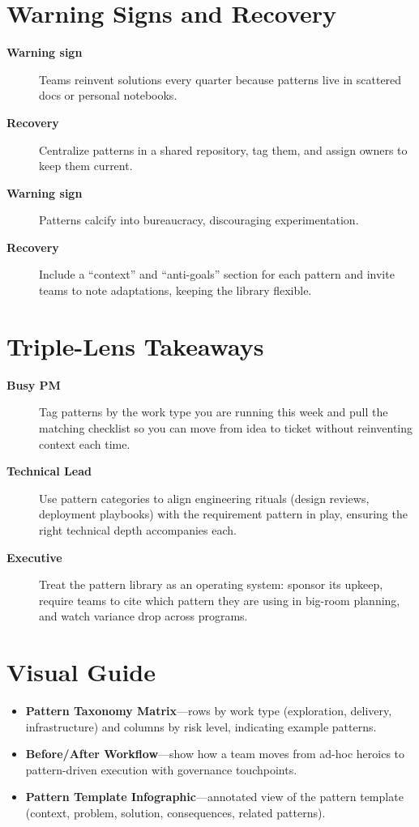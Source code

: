 \section{Warning Signs and Recovery}
\label{sec:implementation-warning}
\begin{description}
    \item[\textbf{Warning sign}] Teams reinvent solutions every quarter because patterns live in scattered docs or personal notebooks.
    \item[\textbf{Recovery}] Centralize patterns in a shared repository, tag them, and assign owners to keep them current.
    \item[\textbf{Warning sign}] Patterns calcify into bureaucracy, discouraging experimentation.
    \item[\textbf{Recovery}] Include a ``context'' and ``anti-goals'' section for each pattern and invite teams to note adaptations, keeping the library flexible.
\end{description}

\section{Triple-Lens Takeaways}
\label{sec:implementation-triple}

\begin{description}
    \item[\textbf{Busy PM}] Tag patterns by the work type you are running this week and pull the matching checklist so you can move from idea to ticket without reinventing context each time.
    \item[\textbf{Technical Lead}] Use pattern categories to align engineering rituals (design reviews, deployment playbooks) with the requirement pattern in play, ensuring the right technical depth accompanies each.
    \item[\textbf{Executive}] Treat the pattern library as an operating system: sponsor its upkeep, require teams to cite which pattern they are using in big-room planning, and watch variance drop across programs.
\end{description}
\section{Visual Guide}
\label{sec:implementation-visuals}
\begin{itemize}
    \item \textbf{Pattern Taxonomy Matrix}—rows by work type (exploration, delivery, infrastructure) and columns by risk level, indicating example patterns.
    \item \textbf{Before/After Workflow}—show how a team moves from ad-hoc heroics to pattern-driven execution with governance touchpoints.
    \item \textbf{Pattern Template Infographic}—annotated view of the pattern template (context, problem, solution, consequences, related patterns).
\end{itemize}

